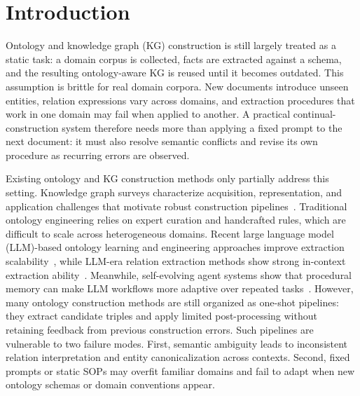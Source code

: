 \documentclass[sigconf]{acmart}
\begin{document}

\maketitle


\section{Introduction}

Ontology and knowledge graph (KG) construction is still largely treated as a static task: a domain corpus is collected, facts are extracted against a schema, and the resulting ontology-aware KG is reused until it becomes outdated. This assumption is brittle for real domain corpora. New documents introduce unseen entities, relation expressions vary across domains, and extraction procedures that work in one domain may fail when applied to another. A practical continual-construction system therefore needs more than applying a fixed prompt to the next document: it must also resolve semantic conflicts and revise its own procedure as recurring errors are observed.

Existing ontology and KG construction methods only partially address this setting. Knowledge graph surveys characterize acquisition, representation, and application challenges that motivate robust construction pipelines~\cite{hogan2021knowledge,ji2021survey}. Traditional ontology engineering relies on expert curation and handcrafted rules, which are difficult to scale across heterogeneous domains. Recent large language model (LLM)-based ontology learning and engineering approaches improve extraction scalability~\cite{ontologyllm2023,llms4ol2023,ontochat2024,ontogpt2023}, while LLM-era relation extraction methods show strong in-context extraction ability~\cite{wan2023gptre,wadhwa2023revisiting,swarup2025llm4re}. Meanwhile, self-evolving agent systems show that procedural memory can make LLM workflows more adaptive over repeated tasks~\cite{genericagent2025}. However, many ontology construction methods are still organized as one-shot pipelines: they extract candidate triples and apply limited post-processing without retaining feedback from previous construction errors. Such pipelines are vulnerable to two failure modes. First, semantic ambiguity leads to inconsistent relation interpretation and entity canonicalization across contexts. Second, fixed prompts or static SOPs may overfit familiar domains and fail to adapt when new ontology schemas or domain conventions appear.
\end{document}

